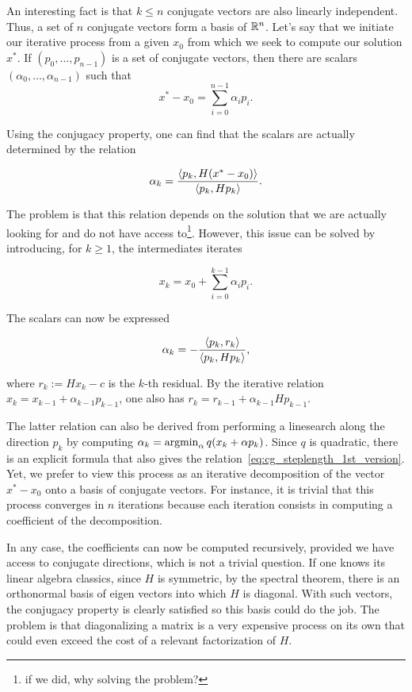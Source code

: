 \documentclass[10pt]{article}
\numberwithin{equation}{section}
\begin{document}
	An interesting fact is that $k\le n$ conjugate vectors are also linearly independent. Thus, a set of $n$ conjugate vectors form a basis of ${\mathbb{R}}^n$. Let's say that we initiate our iterative process from a given $x_0$ from which we seek to compute our solution $x^*$. If $(p_0,\ldots,p_{n-1})$ is a set of conjugate vectors, then there are scalars $(\alpha_0,\ldots,\alpha_{n-1})$ such that
	\[ x^*-x_0 = \sum_{i=0}^{n-1} \alpha_i p_i.\]
	
	Using the conjugacy property, one can find that the scalars are actually determined by the relation
	
	\[ \alpha_k = \dfrac{\left\langle {p_k} , {H(x^*-x_0)} \right\rangle}{\left\langle {p_k} , {Hp_k} \right\rangle}.\]
	
	The problem is that this relation depends on the solution that we are actually looking for and do not have access to\footnote{if we did, why solving the problem?}. However, this issue can be solved by introducing, for $k\ge 1$, the intermediates iterates 
	
	\[ x_k = x_0 + \sum_{i=0}^{k-1} \alpha_i p_i.\]
	
	The scalars can now be expressed
	
	\begin{equation}\label{eq:cg_steplength_1st_version}
		\alpha_k = -\dfrac{\left\langle {p_k} , {r_k} \right\rangle}{\left\langle {p_k} , {Hp_k} \right\rangle},
	\end{equation}
	
	where $r_k := Hx_k - c$ is the $k$-th residual. By the iterative relation $x_{k} = x_{k-1}+\alpha_{k-1}p_{k-1}$, one also has $r_{k}=r_{k-1} + \alpha_{k-1}Hp_{k-1}$.
	
	The latter relation can also be derived from performing a linesearch along the direction $p_k$ by computing $\alpha_k = \operatorname*{argmin}_\alpha q(x_k + \alpha p_k)$. Since $q$ is quadratic, there is an explicit formula that also gives the relation~\eqref{eq:cg_steplength_1st_version}. Yet, we prefer to view this process as an iterative decomposition of the vector $x^*-x_0$ onto a basis of conjugate vectors. For instance, it is trivial that this process converges in $n$ iterations because each iteration consists in computing a coefficient of the decomposition. 
	
	In any case, the coefficients can now be computed recursively, provided we have access to conjugate directions, which is not a trivial question. If one knows its linear algebra classics, since $H$ is symmetric, by the spectral theorem, there is an orthonormal basis of eigen vectors into which $H$ is diagonal. With such vectors, the conjugacy property is clearly satisfied so this basis could do the job. The problem is that diagonalizing a matrix is a very expensive process on its own that could even exceed the cost of a relevant factorization of $H$. 
	
\end{document}
